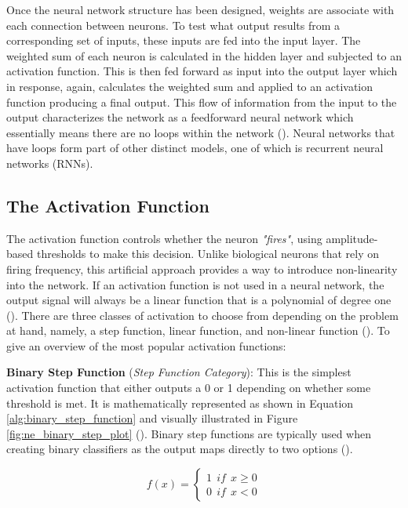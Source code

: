 \parbreak\noindent Once the neural network structure has been designed, weights are associate with each connection between neurons. To test what output results from a corresponding set of inputs, these inputs are fed into the input layer. The weighted sum of each neuron is calculated in the hidden layer and subjected to an activation function. This is then fed forward as input into the output layer which in response, again, calculates the weighted sum and applied to an activation function producing a final output. This flow of information from the input to the output characterizes the network as a feedforward neural network which essentially means there are no loops within the network (\cite{nielsen2015neural}). Neural networks that have loops form part of other distinct models, one of which is recurrent neural networks (RNNs).

\subsection{The Activation Function}
The activation function controls whether the neuron \textit{"fires"}, using amplitude-based thresholds to make this decision. Unlike biological neurons that rely on firing frequency, this artificial approach provides a way to introduce non-linearity into the network. If an activation function is not used in a neural network, the output signal will always be a linear function that is a polynomial of degree one (\cite{sharma2017activation}). There are three classes of activation to choose from depending on the problem at hand, namely, a step function, linear function, and non-linear function (\cite{suzuki2011artificial}). To give an overview of the most popular activation functions:

\parbreak\noindent \textbf{Binary Step Function} (\textit{Step Function Category}): This is the simplest activation function that either outputs a 0 or 1 depending on whether some threshold is met. It is mathematically represented as shown in Equation \ref{alg:binary_step_function} and visually illustrated in Figure \ref{fig:ne_binary_step_plot} (\cite{sharma2017activation}). Binary step functions are typically used when creating binary classifiers as the output maps directly to two options (\cite{sharma2017activation}).
    
\parbreak
\begin{ceqn}
    \begin{equation}\label{alg:binary_step_function}
        f(x) = 
        \begin{cases} 
            1 \:\: if \:\: x \geq 0 \\
            0 \:\: if \:\: x < 0 
        \end{cases}
    \end{equation}
\end{ceqn}


